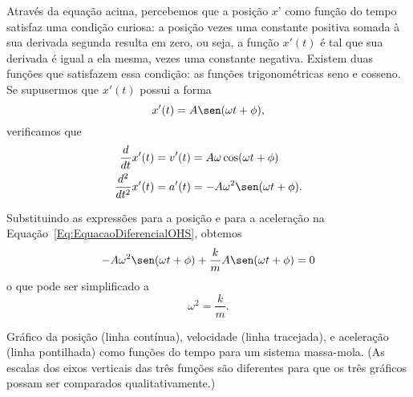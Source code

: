 Através da equação acima, percebemos que a posição $x$' como função do tempo satisfaz uma condição curiosa: a posição vezes uma constante positiva somada à  sua derivada segunda resulta em zero, ou seja, a função $x'(t)$ é tal que sua derivada é igual a ela mesma, vezes uma constante negativa. Existem duas funções que satisfazem essa condição: as funções trigonométricas seno e cosseno. Se supusermos que $x'(t)$ possui a forma
\begin{equation}
	x'(t) = A\sen(\omega t + \phi),
\end{equation}
%
verificamos que
\begin{align}
	\frac{d}{dt}x'(t) &= v'(t) = A\omega\cos(\omega t + \phi) \\
	\frac{d^2}{dt^2} x'(t) &= a'(t) = -A\omega^2\sen(\omega t + \phi).
\end{align}


%
Substituindo as expressões para a posição e para a aceleração na Equação~\eqref{Eq:EquacaoDiferencialOHS}, obtemos
\begin{equation}
	-A\omega^2\sen(\omega t + \phi) + \frac{k}{m}A\sen(\omega t + \phi) = 0
\end{equation}
%
o que pode ser simplificado a
\begin{equation}
	\omega^2 = \frac{k}{m}.
\end{equation}

\begin{marginfigure}
\centering
{}
\caption{Gráfico da posição (linha contínua), velocidade (linha tracejada), e aceleração (linha pontilhada) como funções do tempo para um sistema massa-mola. (As escalas dos eixos verticais das três funções são diferentes para que os três gráficos possam ser comparados qualitativamente.)}
\end{marginfigure}

